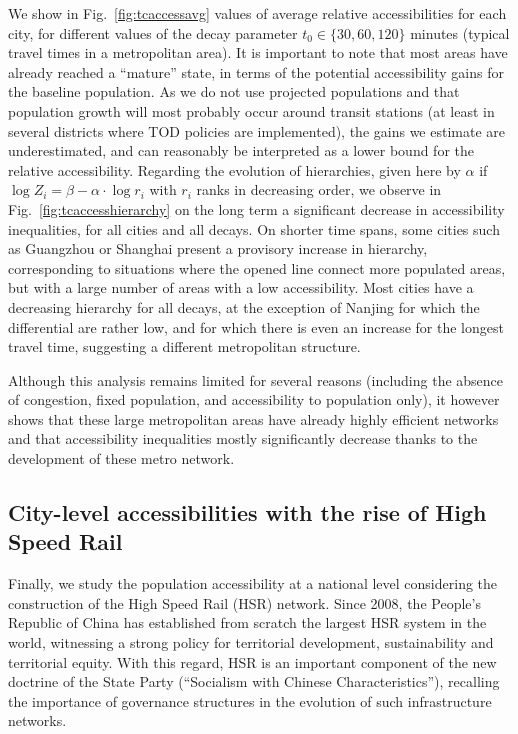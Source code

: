 \documentclass[11pt]{article}
\begin{document}
We show in Fig.~\ref{fig:tcaccessavg} values of average relative accessibilities for each city, for different values of the decay parameter $t_0 \in \{30,60,120\}$ minutes (typical travel times in a metropolitan area). It is important to note that most areas have already reached a ``mature'' state, in terms of the potential accessibility gains for the baseline population. As we do not use projected populations and that population growth will most probably occur around transit stations (at least in several districts where TOD policies are implemented), the gains we estimate are underestimated, and can reasonably be interpreted as a lower bound for the relative accessibility. Regarding the evolution of hierarchies, given here by $\alpha$ if $\log Z_i = \beta - \alpha \cdot \log r_i$ with $r_i$ ranks in decreasing order, we observe in Fig.~\ref{fig:tcaccesshierarchy} on the long term a significant decrease in accessibility inequalities, for all cities and all decays. On shorter time spans, some cities such as Guangzhou or Shanghai present a provisory increase in hierarchy, corresponding to situations where the opened line connect more populated areas, but with a large number of areas with a low accessibility. Most cities have a decreasing hierarchy for all decays, at the exception of Nanjing for which the differential are rather low, and for which there is even an increase for the longest travel time, suggesting a different metropolitan structure.

Although this analysis remains limited for several reasons (including the absence of congestion, fixed population, and accessibility to population only), it however shows that these large metropolitan areas have already highly efficient networks and that accessibility inequalities mostly significantly decrease thanks to the development of these metro network.





\subsection{City-level accessibilities with the rise of High Speed Rail}




Finally, we study the population accessibility at a national level considering the construction of the High Speed Rail (HSR) network. Since 2008, the People's Republic of China has established from scratch the largest HSR system in the world, witnessing a strong policy for territorial development, sustainability and territorial equity. With this regard, HSR is an important component of the new doctrine of the State Party (``Socialism with Chinese Characteristics''), recalling the importance of governance structures in the evolution of such infrastructure networks.
\end{document}
